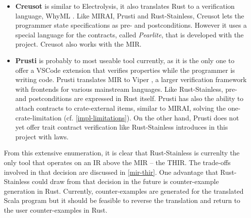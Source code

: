 \begin{itemize}
\item \textbf{Creusot} \cite{creusot} is similar to Electrolysis, it also
translates Rust to a verification language, WhyML \cite{why3}. Like MIRAI,
Prusti and Rust-Stainless, Creusot lets  the programmer state specifications as
pre- and postconditions. However it uses a special language for the contracts,
called \emph{Pearlite}, that is developed with the project. Creusot also works
with the MIR.

\item \textbf{Prusti} \cite{prusti} is probably to most useable tool currently,
as it is the only one  to offer a VSCode extension that verifies properties
while the programmer is writing code. Prusti translates MIR to Viper
\cite{viper}, a larger verification framework with frontends for various
mainstream languages. Like Rust-Stainless, pre- and postconditions are expressed
in Rust itself. Prusti has also the ability to attach contracts to
crate-external items, similar to MIRAI, solving the one-crate-limitation (cf.
\autoref{impl-limitations}). On the other hand, Prusti does not yet offer trait
contract verification like Rust-Stainless introduces in this project with laws.

\end{itemize}

From this extensive enumeration, it is clear that Rust-Stainless is currenlty
the only tool that operates on an IR above the MIR -- the THIR. The trade-offs
involved in that decision are discussed in \autoref{mir-thir}. One advantage
that Rust-Stainless could draw from that decision in the future is
counter-example generation in Rust. Currently, counter-examples are generated
for the translated Scala program but it should be feasible to reverse the
translation and return to the user counter-examples in Rust.
